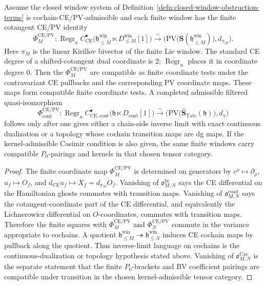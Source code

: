 \begin{lem}
\label{lem:closed-ce-pv-window-limit}
  Assume the closed window system of
  Definition~\ref{defn:closed-window-obstruction-terms} is
  cochain-CE/PV-admissible and each finite window has the finite cotangent
  CE/PV identity
  \[
    \Phi_M^{\mathrm{CE/PV}}\colon
    \operatorname{Regr}_u
    C^\bullet_{\mathrm{CE}}\bigl(\mathfrak h^{\mathrm{win}}_{\leq M}\ltimes
      D^{\mathrm{win}}_{\leq M}[1]\bigr)
    \xrightarrow{\sim}
    \bigl(
      \mathrm{PV}\bigl(\mathbf S(\mathfrak h^{\mathrm{win}}_{\leq M})\bigr),
      d_{\pi_M}\bigr).
  \]
  Here \(\pi_M\) is the linear Kirillov bivector of the finite Lie
  window.  The standard CE degree of a shifted-cotangent dual
  coordinate is \(2\); \(\operatorname{Regr}_u\) places it in coordinate
  degree \(0\).
  Then the \(\Phi_M^{\mathrm{CE/PV}}\) are compatible as finite coordinate tests under the
  contravariant CE pullbacks and the corresponding PV coordinate maps.
  These maps form compatible finite coordinate tests.  A completed
  admissible filtered quasi-isomorphism
  \[
    \Phi^{\mathrm{CE/PV}}_{\mathrm{cont}}\colon
    \operatorname{Regr}_u
    C^\bullet_{\mathrm{CE},\mathrm{cont}}
      \bigl(\mathfrak h\ltimes D_{\mathrm{cont}}[1]\bigr)
    \xrightarrow{\sim}
    \bigl(
      \mathrm{PV}\bigl(\widehat{\mathbf S}_{\mathrm{Tate}}(\mathfrak h)\bigr),
      d_\pi\bigr)
  \]
  follows only after one gives either a chain-side inverse limit with
  exact continuous dualization or a topology whose cochain transition maps
  are dg maps.  If the kernel-admissible Casimir condition is also
  given, the same finite windows carry compatible \(P_0\)-pairings and
  kernels in that chosen tensor category.
\end{lem}

\begin{proof}
  The finite coordinate map \(\Phi_M^{\mathrm{CE/PV}}\) is determined on generators by
  \(c^\rho\mapsto\partial_\rho\), \(u_f\mapsto O_f\), and
  \(d_{\mathrm{CE}}u_f\mapsto X_f=d_{\pi_M}O_f\).  Vanishing of
  \(\mathfrak o^{\mathrm{br}}_{M,N}\) says the CE differential on the
  Hamiltonian ghosts commutes with transition maps.  Vanishing of
  \(\mathfrak o^{\mathrm{coad}}_{M,N}\) says the cotangent-coordinate
  part of the CE differential, and equivalently the Lichnerowicz
  differential on \(O\)-coordinates, commutes with transition maps.
  Therefore the finite squares with
  \(\Phi_M^{\mathrm{CE/PV}}\) and \(\Phi_N^{\mathrm{CE/PV}}\) commute in
  the variance appropriate to cochains.  A quotient
  \(\mathfrak h^{\mathrm{win}}_{\leq M}
  \twoheadrightarrow\mathfrak h^{\mathrm{win}}_{\leq N}\) induces
  CE cochain maps by pullback along the quotient.
  Thus inverse-limit language on cochains is the continuous-dualization
  or topology hypothesis stated above.  Vanishing
  of \(\mathfrak o^{\mathrm{Cas}}_{M,N}\) is the separate statement that
  the finite \(P_0\)-brackets and BV coefficient pairings are compatible
  under transition in the chosen kernel-admissible tensor category.
\end{proof}

